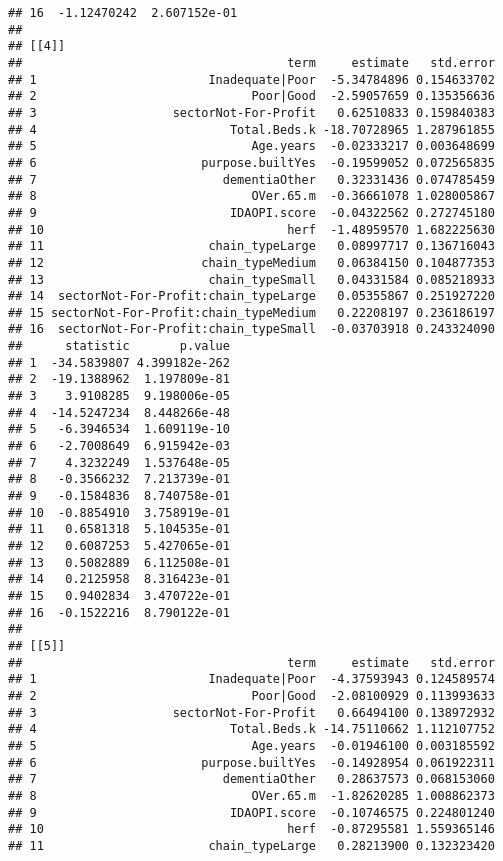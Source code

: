 \documentclass[]{article}
\begin{document}
\begin{verbatim}
## 16  -1.12470242  2.607152e-01
## 
## [[4]]
##                                     term     estimate   std.error
## 1                        Inadequate|Poor  -5.34784896 0.154633702
## 2                              Poor|Good  -2.59057659 0.135356636
## 3                   sectorNot-For-Profit   0.62510833 0.159840383
## 4                           Total.Beds.k -18.70728965 1.287961855
## 5                              Age.years  -0.02333217 0.003648699
## 6                       purpose.builtYes  -0.19599052 0.072565835
## 7                          dementiaOther   0.32331436 0.074785459
## 8                              OVer.65.m  -0.36661078 1.028005867
## 9                           IDAOPI.score  -0.04322562 0.272745180
## 10                                  herf  -1.48959570 1.682225630
## 11                       chain_typeLarge   0.08997717 0.136716043
## 12                      chain_typeMedium   0.06384150 0.104877353
## 13                       chain_typeSmall   0.04331584 0.085218933
## 14  sectorNot-For-Profit:chain_typeLarge   0.05355867 0.251927220
## 15 sectorNot-For-Profit:chain_typeMedium   0.22208197 0.236186197
## 16  sectorNot-For-Profit:chain_typeSmall  -0.03703918 0.243324090
##      statistic       p.value
## 1  -34.5839807 4.399182e-262
## 2  -19.1388962  1.197809e-81
## 3    3.9108285  9.198006e-05
## 4  -14.5247234  8.448266e-48
## 5   -6.3946534  1.609119e-10
## 6   -2.7008649  6.915942e-03
## 7    4.3232249  1.537648e-05
## 8   -0.3566232  7.213739e-01
## 9   -0.1584836  8.740758e-01
## 10  -0.8854910  3.758919e-01
## 11   0.6581318  5.104535e-01
## 12   0.6087253  5.427065e-01
## 13   0.5082889  6.112508e-01
## 14   0.2125958  8.316423e-01
## 15   0.9402834  3.470722e-01
## 16  -0.1522216  8.790122e-01
## 
## [[5]]
##                                     term     estimate   std.error
## 1                        Inadequate|Poor  -4.37593943 0.124589574
## 2                              Poor|Good  -2.08100929 0.113993633
## 3                   sectorNot-For-Profit   0.66494100 0.138972932
## 4                           Total.Beds.k -14.75110662 1.112107752
## 5                              Age.years  -0.01946100 0.003185592
## 6                       purpose.builtYes  -0.14928954 0.061922311
## 7                          dementiaOther   0.28637573 0.068153060
## 8                              OVer.65.m  -1.82620285 1.008862373
## 9                           IDAOPI.score  -0.10746575 0.224801240
## 10                                  herf  -0.87295581 1.559365146
## 11                       chain_typeLarge   0.28213900 0.132323420

\end{verbatim}
\end{document}
